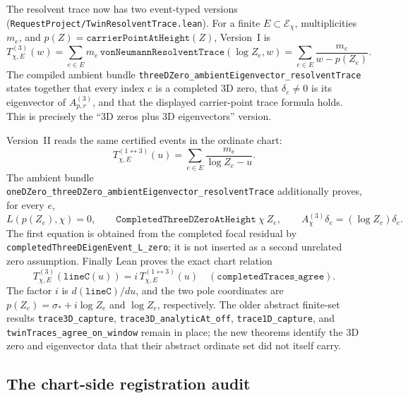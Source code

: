 The resolvent trace now has two event-typed versions
(\texttt{RequestProject/TwinResolventTrace.lean}).  For a finite
\(E\subset\mathcal E_\chi\), multiplicities \(m_e\), and
\(p(Z)=\texttt{carrierPointAtHeight}(Z)\), Version~I is
\[
 T^{(3)}_{\chi,E}(w)
 =\sum_{e\in E}m_e\,
   \texttt{vonNeumannResolventTrace}(\log Z_e,w)
 =\sum_{e\in E}\frac{m_e}{w-p(Z_e)}.
\]
The compiled ambient bundle
\texttt{threeDZero\_ambientEigenvector\_resolventTrace} states together that every
index \(e\) is a completed 3D zero, that \(\delta_e\ne0\) is its eigenvector
of \(A^{(3)}_{p,r}\), and that the displayed carrier-point trace formula
holds.  This is precisely the ``3D zeros plus 3D eigenvectors'' version.

Version~II reads the same certified events in the ordinate chart:
\[
 T^{(1\leftrightarrow3)}_{\chi,E}(u)
 =\sum_{e\in E}\frac{m_e}{\log Z_e-u}.
\]
The ambient bundle
\texttt{oneDZero\_threeDZero\_ambientEigenvector\_resolventTrace} additionally
proves, for every \(e\),
\[
 L\!\left(p(Z_e),\chi\right)=0,
 \qquad
 \texttt{CompletedThreeDZeroAtHeight}\ \chi\ Z_e,
 \qquad
 A^{(3)}_\chi\delta_e=(\log Z_e)\delta_e.
\]
The first equation is obtained from the completed focal residual by
\texttt{completedThreeDEigenEvent\_L\_zero}; it is not inserted as a second
unrelated zero assumption.  Finally Lean proves the exact chart relation
\[
 T^{(3)}_{\chi,E}(\texttt{lineC}(u))
 =i\,T^{(1\leftrightarrow3)}_{\chi,E}(u)
 \quad(\texttt{completedTraces\_agree}).
\]
The factor \(i\) is \(d(\texttt{lineC})/du\), and the two pole coordinates
are \(p(Z_e)=\sigma_*+i\log Z_e\) and \(\log Z_e\), respectively.  The older
abstract finite-set results \texttt{trace3D\_capture},
\texttt{trace3D\_analyticAt\_off}, \texttt{trace1D\_capture}, and
\texttt{twinTraces\_agree\_on\_window} remain in place; the new theorems
identify the 3D zero and eigenvector data that their abstract ordinate set did
not itself carry.

\subsection{The chart-side registration audit}\label{sec:grh-audit}

